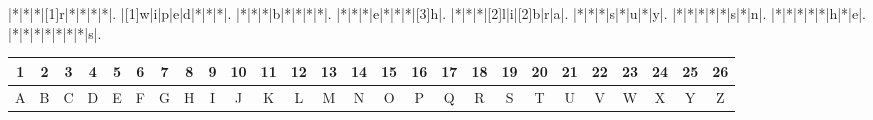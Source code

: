 \documentclass{exam}
\begin{document}
\begin{Puzzle}{8}{9}
|*|*|*|[1]r|*|*|*|*|.
|[1]w|i|p|e|d|*|*|*|.
|*|*|*|b|*|*|*|*|.
|*|*|*|e|*|*|*|[3]h|.
|*|*|*|[2]l|i|[2]b|r|a|.
|*|*|*|s|*|u|*|y|.
|*|*|*|*|*|s|*|n|.
|*|*|*|*|*|h|*|e|.
|*|*|*|*|*|*|*|s|.
\end{Puzzle}
\begin{center}
{\footnotesize
\begin{tabular}{|c|c|c|c|c|c|c|c|c|c|c|c|c|c|c|c|c|c|c|c|c|c|c|c|c|c|}
\hline
1 & 2 & 3 & 4 & 5 & 6 & 7 & 8 & 9 & 10 & 11 & 12 & 13 & 14 & 15 & 16 & 17 & 18 & 19 & 20 & 21 & 22 & 23 & 24 & 25 & 26 \\
\hline
A & B & C & D & E & F & G & H & I & J & K & L & M & N & O & P & Q & R & S & T & U & V & W & X & Y & Z \\
\hline
\end{tabular}
}
\end{center}
\end{document}
